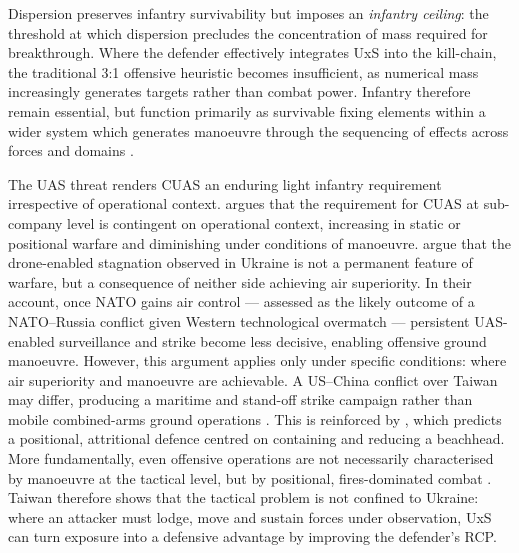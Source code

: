 

Dispersion preserves infantry survivability but imposes an \textit{infantry ceiling}: the threshold at which dispersion precludes the concentration of mass required for breakthrough. Where the defender effectively integrates UxS into the kill-chain, the traditional 3:1 offensive heuristic becomes insufficient, as numerical mass increasingly generates targets rather than combat power. Infantry therefore remain essential, but function primarily as survivable fixing elements within a wider system which generates manoeuvre through the sequencing of effects across forces and domains \parencite[5--11]{watling_2025_10}.


The UAS threat renders CUAS an enduring light infantry requirement irrespective of operational context. \textcite{stu_lyle_participant_11} argues that the requirement for CUAS at sub-company level is contingent on operational context, increasing in static or positional warfare and diminishing under conditions of manoeuvre. \textcite[vi, 22--23,~31]{hvizda_2025} argue that the drone-enabled stagnation observed in Ukraine is not a permanent feature of  warfare, but a consequence of neither side achieving air superiority. In their account, once NATO gains air control --- assessed as the likely outcome of a NATO--Russia conflict given Western technological overmatch --- persistent UAS-enabled surveillance and strike become less decisive, enabling offensive ground manoeuvre. However, this argument applies only under specific conditions: where air superiority and manoeuvre are achievable. A US--China conflict over Taiwan may differ, producing a maritime and stand-off strike campaign rather than mobile combined-arms ground operations \parencite[34--35]{hvizda_2025}. This is reinforced by \textcite{cancian_2023_first_battle_next_war}, which predicts a positional, attritional defence centred on containing and reducing a beachhead. More fundamentally, even offensive operations are not necessarily characterised by manoeuvre at the tactical level, but by positional, fires-dominated combat \parencite{FOX_2021,KING_2023}. Taiwan therefore shows that the tactical problem is not confined to Ukraine: where an attacker must lodge, move and sustain forces under observation, UxS can turn exposure into a defensive advantage by improving the defender's RCP.

